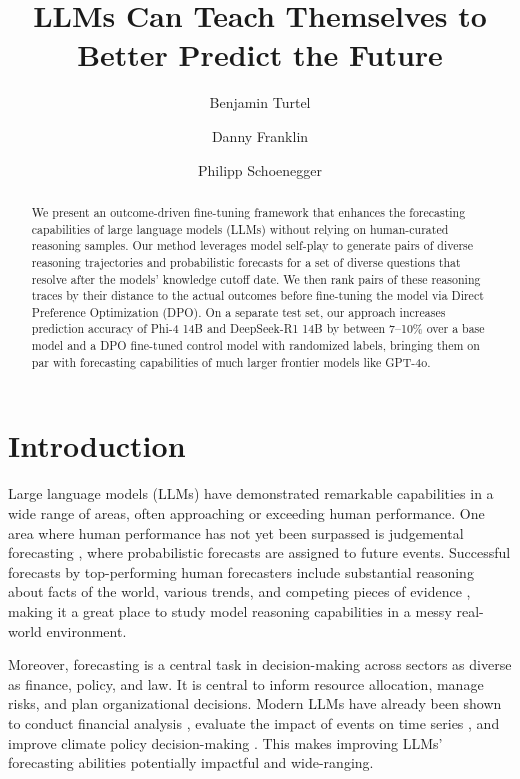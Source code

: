 \documentclass{article}
\title{
  \vspace{-2cm} %
  \bfseries LLMs Can Teach Themselves to Better Predict the Future
}
\author[1]{Benjamin Turtel}
\author[1]{Danny Franklin}
\author[2]{Philipp Schoenegger}
\affil[1]{\href{https://www.lightningrod.ai/}{Lightning Rod Labs}}
\affil[2]{London School of Economics and Political Science}
\date{} %
\begin{document}
\maketitle

\begin{abstract}
We present an outcome-driven fine-tuning framework that enhances the forecasting capabilities of large language models (LLMs) without relying on human-curated reasoning samples. Our method leverages model self-play to generate pairs of diverse reasoning trajectories and probabilistic forecasts for a set of diverse questions that resolve after the models’ knowledge cutoff date. We then rank pairs of these reasoning traces by their distance to the actual outcomes before fine-tuning the model via Direct Preference Optimization (DPO). On a separate test set, our approach increases prediction accuracy of Phi-4 14B and DeepSeek-R1 14B by between 7--10\% over a base model and a DPO fine-tuned control model with randomized labels, bringing them on par with forecasting capabilities of much larger frontier models like GPT-4o. 



\end{abstract}


\section{Introduction}
Large language models (LLMs) have demonstrated remarkable capabilities in a wide range of areas, often approaching or exceeding human performance. One area where human performance has not yet been surpassed is judgemental forecasting \cite{Karger2024}, where probabilistic forecasts are assigned to future events. Successful forecasts by top-performing human forecasters include substantial reasoning about facts of the world, various trends, and competing pieces of evidence \cite{Tetlock2016}, making it a great place to study model reasoning capabilities in a messy real-world environment.

Moreover, forecasting is a central task in decision-making across sectors as diverse as finance, policy, and law. It is central to inform resource allocation, manage risks, and plan organizational decisions. Modern LLMs have already been shown to conduct financial analysis \cite{Kim2024}, evaluate the impact of events on time series \cite{Wang2024}, and improve climate policy decision-making \cite{Cao2024}. This makes improving LLMs’ forecasting abilities potentially impactful and wide-ranging.
\end{document}
